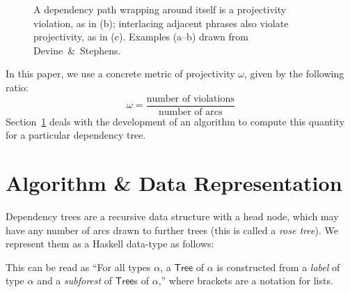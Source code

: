 \documentclass{article}
\def\resethooks{%
  \global\let\SaveRestoreHook\empty
  \global\let\ColumnHook\empty}
\let\hspre\empty
\let\hspost\empty
\begin{document}
\begin{figure}[h!]
\centering
{}
\hspace{6pt}

\caption{A dependency path wrapping around itself is a projectivity violation,
as in (b); interlacing adjacent phrases also violate projectivity, as in
(c). Examples (a--b) drawn from Devine~\&~Stephens.}
\label{fig:dependency-trees}
\end{figure}

\noindent
In this paper, we use a concrete metric of projectivity $\omega$, given by the following
ratio:
\[
    \omega = \frac{\text{number of violations}}{\text{number of arcs}}
\]
Section~\ref{sec:algorithm} deals with the development of an algorithm to
compute this quantity for a particular dependency tree.

\section{Algorithm \& Data Representation}
\label{sec:algorithm}

Dependency trees are a recursive data structure
with a head node, which may have any number of arcs drawn to further trees (this
is called a \emph{rose tree}). We represent them as a Haskell data-type as
follows:
\begin{hscode}\SaveRestoreHook
\column{B}{@{}>{\hspre}l<{\hspost}@{}}%
\column{3}{@{}>{\hspre}l<{\hspost}@{}}%
\column{E}{@{}>{\hspre}l<{\hspost}@{}}%
\>[3]{}\;\;\alpha\mathrel{=}\alpha{}\<[E]%
\ColumnHook
\end{hscode}\resethooks
This can be read as ``For all types \ensuremath{\alpha}, a \ensuremath{\mathsf{Tree}} of \ensuremath{\alpha} is constructed from a
\emph{label} of type \ensuremath{\alpha} and a \emph{subforest} of \ensuremath{\mathsf{Tree}}s of \ensuremath{\alpha},'' where brackets are a notation
for lists.
\end{document}

